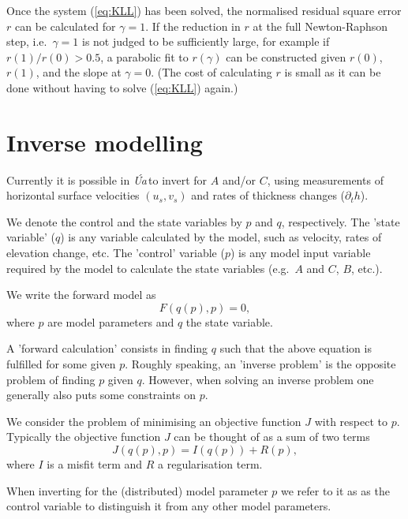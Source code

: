 \documentclass[10pt,a4paper]{book}
\newcommand{\p}{\partial}
\newcommand{\Ua}{\textsl{\'Ua}\,}
\begin{document}
Once the system (\ref{eq:KLL}) has been solved, the normalised
residual square error $r$ can be calculated for $\gamma=1$.  If the
reduction in $r$ at the full Newton-Raphson step, i.e.\ $\gamma=1$ is
not judged to be sufficiently large, for example if $r(1)/r(0)>0.5$, a
parabolic fit to $r(\gamma)$ can be constructed given $r(0)$, $r(1)$,
and the slope at $\gamma=0$. (The cost of calculating $r$ is small as
it can be done without having to solve (\ref{eq:KLL}) again.) 

\chapter{Inverse modelling}

Currently it is possible in \Ua to invert for $A$ and/or $C$, using
measurements of horizontal surface velocities $(u_s,v_s)$ and rates of
thickness changes ($\p_t h$).

We denote the control and the state variables by $p$ and $q$,
respectively. The 'state variable' ($q$) is any variable calculated by the
model, such as velocity, rates of elevation change, etc. The 'control'
variable ($p$) is any model input variable required by the model to calculate
the state variables (e.g.\ $A$ and $C$,  $B$, etc.). 

We write the forward model as
\[
F(q(p),p)=0 ,
\]
where $p$ are model parameters and $q$ the state variable.

A 'forward calculation' consists in finding $q$ such that the above
equation is fulfilled for some given $p$. Roughly speaking, an
'inverse problem' is the opposite problem of finding $p$ given
$q$. However, when solving an inverse problem one generally also puts
some constraints on $p$.


We consider
the problem of minimising an objective function $J$ with respect to
$p$. Typically the objective function $J$ can be thought of as a sum of two terms
\[
 J(q(p),p)=I(q(p))+R(p) ,
\] 
where $I$ is a misfit term and $R$ a regularisation term. 

When inverting for the (distributed) model parameter $p$ we refer to it as as the
control variable to distinguish it from any other model parameters.
\end{document}
